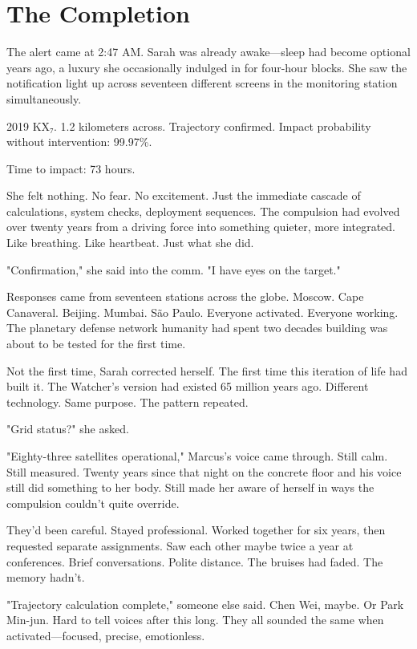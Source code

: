 \chapter{The Completion}
\label{ch:30}


The alert came at 2:47 AM. Sarah was already awake—sleep had become optional years ago, a luxury she occasionally indulged in for four-hour blocks. She saw the notification light up across seventeen different screens in the monitoring station simultaneously.

2019 KX₇. 1.2 kilometers across. Trajectory confirmed. Impact probability without intervention: 99.97\%.

Time to impact: 73 hours.

She felt nothing. No fear. No excitement. Just the immediate cascade of calculations, system checks, deployment sequences. The compulsion had evolved over twenty years from a driving force into something quieter, more integrated. Like breathing. Like heartbeat. Just what she did.

"Confirmation," she said into the comm. "I have eyes on the target."

Responses came from seventeen stations across the globe. Moscow. Cape Canaveral. Beijing. Mumbai. São Paulo. Everyone activated. Everyone working. The planetary defense network humanity had spent two decades building was about to be tested for the first time.

Not the first time, Sarah corrected herself. The first time this iteration of life had built it. The Watcher's version had existed 65 million years ago. Different technology. Same purpose. The pattern repeated.

"Grid status?" she asked.

"Eighty-three satellites operational," Marcus's voice came through. Still calm. Still measured. Twenty years since that night on the concrete floor and his voice still did something to her body. Still made her aware of herself in ways the compulsion couldn't quite override.

They'd been careful. Stayed professional. Worked together for six years, then requested separate assignments. Saw each other maybe twice a year at conferences. Brief conversations. Polite distance. The bruises had faded. The memory hadn't.

"Trajectory calculation complete," someone else said. Chen Wei, maybe. Or Park Min-jun. Hard to tell voices after this long. They all sounded the same when activated—focused, precise, emotionless.

